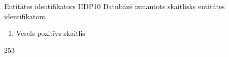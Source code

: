 \parameterTable
{Entitātes identifikators}
{IIDP10}
{
	Datubāzē izmantots skaitlisks entitātes identifikators.
}
{
	\begin{enumerate}
		\item Vesels pozitīvs skaitlis
	\end{enumerate}
}
{
	253
}
